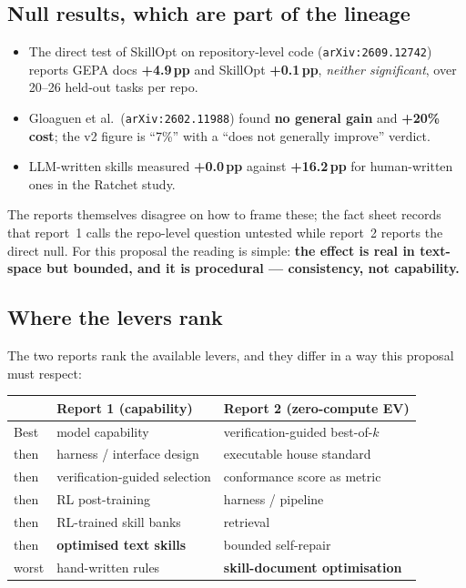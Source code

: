 \documentclass[11pt,a4paper]{article}
\begin{document}
\subsection{Null results, which are part of the lineage}

\begin{itemize}[leftmargin=1.4em]
  \item The direct test of SkillOpt on repository-level code
  (\texttt{arXiv:2609.12742}) reports GEPA docs \textbf{+4.9\,pp} and SkillOpt
  \textbf{+0.1\,pp}, \emph{neither significant}, over 20--26 held-out tasks per repo.
  \item Gloaguen et al.\ (\texttt{arXiv:2602.11988}) found \textbf{no general gain}
  and \textbf{+20\% cost}; the v2 figure is ``7\%'' with a ``does not generally
  improve'' verdict.
  \item LLM-written skills measured \textbf{+0.0\,pp} against \textbf{+16.2\,pp} for
  human-written ones in the Ratchet study.
\end{itemize}

The reports themselves disagree on how to frame these; the fact sheet records that
report~1 calls the repo-level question untested while report~2 reports the direct
null. For this proposal the reading is simple: \textbf{the effect is real in
text-space but bounded, and it is procedural --- consistency, not capability.}

\subsection{Where the levers rank}

The two reports rank the available levers, and they differ in a way this proposal
must respect:

\begin{center}
\begin{tabular}{@{}p{}p{}p{}@{}}
\toprule
& \textbf{Report 1 (capability)} & \textbf{Report 2 (zero-compute EV)} \\
\midrule
Best & model capability & verification-guided best-of-$k$ \\
then & harness / interface design & executable house standard \\
then & verification-guided selection & conformance score as metric \\
then & RL post-training & harness / pipeline \\
then & RL-trained skill banks & retrieval \\
then & \textbf{optimised text skills} & bounded self-repair \\
worst & hand-written rules & \textbf{skill-document optimisation} \\
\bottomrule
\end{tabular}
\end{center}
\end{document}
